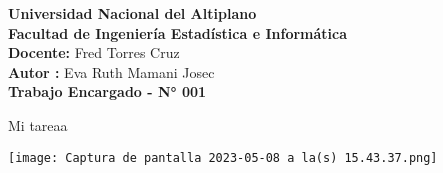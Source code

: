 \documentclass[12pt]{article}
\begin{document}
\noindent \textbf{Universidad Nacional del Altiplano\\
Facultad de Ingeniería Estadística e Informática\\
Docente: } Fred Torres Cruz\\
\textbf{Autor :} Eva Ruth Mamani Josec\\

\vspace{5mm}
\noindent\textbf{Trabajo Encargado - N° 001}\\
\noindent 

Mi tareaa

\texttt{[image: Captura de pantalla 2023-05-08 a la(s) 15.43.37.png]}
\end{document}
